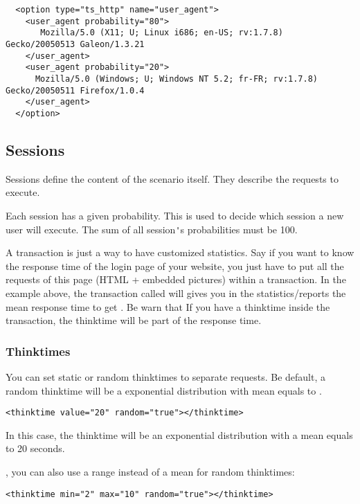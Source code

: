 \documentclass{IDXDOC-en}
\begin{document}
\begin{Verbatim}
  <option type="ts_http" name="user_agent">
    <user_agent probability="80">
       Mozilla/5.0 (X11; U; Linux i686; en-US; rv:1.7.8) Gecko/20050513 Galeon/1.3.21
    </user_agent>
    <user_agent probability="20">
      Mozilla/5.0 (Windows; U; Windows NT 5.2; fr-FR; rv:1.7.8) Gecko/20050511 Firefox/1.0.4
    </user_agent>
  </option>
\end{Verbatim}

\subsection{Sessions}


Sessions define the content of the scenario itself. They describe
the requests to execute.


Each session has a given probability. This is used to decide which
session a new user will execute. The sum of all session\verb|'|s
probabilities must be 100.

A transaction is just a way to have customized statistics. Say if you
want to know the response time of the login page of your website, you
just have to put all the requests of this page (HTML + embedded
pictures) within a transaction. In the example above, the transaction
called  will gives you in the
statistics/reports the mean response time to get
. Be warn that If you have a
thinktime inside the transaction, the thinktime will be part of the
response time.

\subsubsection{Thinktimes}

You can set static or random thinktimes to separate requests. Be
default, a random thinktime will be a exponential distribution with
mean equals to .

\begin{Verbatim}
<thinktime value="20" random="true"></thinktime>
\end{Verbatim}

In this case, the thinktime will be an exponential distribution with a
mean equals to 20 seconds.

, you can also use a range
 instead of a mean for random thinktimes:
\begin{Verbatim}
<thinktime min="2" max="10" random="true"></thinktime>
\end{Verbatim}
\end{document}
